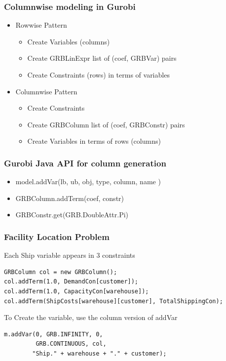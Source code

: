 \documentclass[12pt,handout]{beamer}
\begin{document}
\begin{frame}
\frametitle {Columnwise modeling in Gurobi}
\begin{itemize}
  \item Rowwise Pattern
  \begin{itemize}
    \item Create Variables (columns)
    \item Create GRBLinExpr list of (coef, GRBVar) pairs
    \item Create Constraints (rows) in terms of variables
  \end{itemize}
  \item Columnwise Pattern
  \begin{itemize}
    \item Create Constraints
    \item Create GRBColumn list of (coef, GRBConstr) pairs
    \item Create Variables in terms of rows (columns)
  \end{itemize}
\end{itemize}
\end{frame}


\begin{frame}
\frametitle{Gurobi Java API for column generation}
\begin{itemize}
\item model.addVar(lb, ub, obj, type, column, name )
\item GRBColumn.addTerm(coef, constr)
\item GRBConstr.get(GRB.DoubleAttr.Pi)
\end{itemize}
\end{frame}

\begin{frame}[containsverbatim]
  \frametitle{Facility Location Problem}
  Each Ship variable appears in 3 constraints
{\small
\begin{verbatim}
GRBColumn col = new GRBColumn();
col.addTerm(1.0, DemandCon[customer]);
col.addTerm(1.0, CapacityCon[warehouse]);
col.addTerm(ShipCosts[warehouse][customer], TotalShippingCon);
\end{verbatim}
}

To Create the variable, use the column version of addVar
\begin{verbatim}
m.addVar(0, GRB.INFINITY, 0,
         GRB.CONTINUOUS, col,
        "Ship." + warehouse + "." + customer);
\end{verbatim}
\end{frame}
\end{document}
